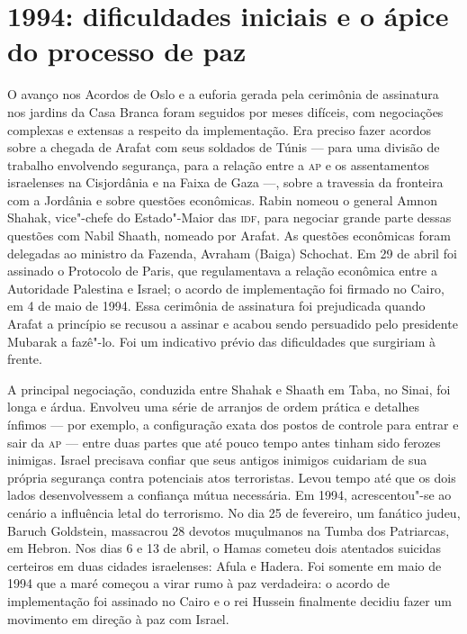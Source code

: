 \section{1994: dificuldades iniciais e o ápice do processo de paz}

O avanço nos Acordos de Oslo e a euforia gerada pela cerimônia de
assinatura nos jardins da Casa Branca foram seguidos por meses difíceis,
com negociações complexas e extensas a respeito da implementação. Era
preciso fazer acordos sobre a chegada de Arafat com seus soldados de
Túnis --- para uma divisão de trabalho envolvendo segurança, para a
relação entre a \textsc{ap} e os assentamentos israelenses na Cisjordânia e na
Faixa de Gaza ---, sobre a travessia da fronteira com a Jordânia e sobre
questões econômicas. Rabin nomeou o general Amnon Shahak, vice"-chefe do
Estado"-Maior das \textsc{idf}, para negociar grande parte dessas questões com
Nabil Shaath, nomeado por Arafat. As questões econômicas foram delegadas
ao ministro da Fazenda, Avraham (Baiga) Schochat. Em 29 de abril foi
assinado o Protocolo de Paris, que regulamentava a relação econômica
entre a Autoridade Palestina e Israel; o acordo de implementação foi
firmado no Cairo, em 4 de maio de 1994. Essa cerimônia de assinatura
foi prejudicada quando Arafat a princípio se recusou a assinar e acabou
sendo persuadido pelo presidente Mubarak a fazê"-lo. Foi um indicativo
prévio das dificuldades que surgiriam à frente.

A principal negociação, conduzida entre Shahak e Shaath em Taba, no
Sinai, foi longa e árdua. Envolveu uma série de arranjos de ordem
prática e detalhes ínfimos --- por exemplo, a configuração exata dos
postos de controle para entrar e sair da \textsc{ap} --- entre duas partes que até
pouco tempo antes tinham sido ferozes inimigas. Israel precisava confiar
que seus antigos inimigos cuidariam de sua própria segurança contra
potenciais atos terroristas. Levou tempo até que os dois lados
desenvolvessem a confiança mútua necessária. Em 1994, acrescentou"-se ao
cenário a influência letal do terrorismo. No dia 25 de fevereiro, um
fanático judeu, Baruch Goldstein, massacrou 28 devotos
muçulmanos na Tumba dos Patriarcas, em Hebron. Nos dias 6 e 13 de abril,
o Hamas cometeu dois atentados suicidas certeiros em duas cidades
israelenses: Afula e Hadera. Foi somente em maio de 1994 que a maré
começou a virar rumo à paz verdadeira: o acordo de implementação foi
assinado no Cairo e o rei Hussein finalmente decidiu fazer um movimento
em direção à paz com Israel.


